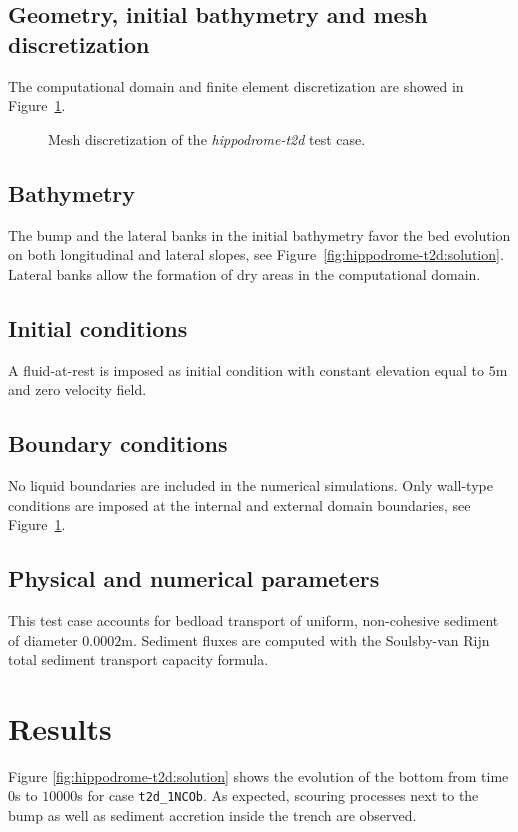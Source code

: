 \subsection{Geometry, initial bathymetry and mesh discretization}
%
The computational domain and finite element discretization are showed in Figure~\ref{fig:hippodrome-t2d:mesh}. 

\begin{figure}[H]
 \centering
 \caption{Mesh discretization of the \textit{hippodrome-t2d} test case.}
 \label{fig:hippodrome-t2d:mesh}
\end{figure}
%
\subsection{Bathymetry}
%
The bump and the lateral banks in the initial bathymetry favor the bed evolution on both longitudinal and lateral slopes, see Figure~\ref{fig:hippodrome-t2d:solution}. Lateral banks allow the formation of dry areas in the computational domain.

\subsection{Initial conditions}
%
A fluid-at-rest is imposed as initial condition with constant elevation equal to $5$m and zero velocity field.

\subsection{Boundary conditions}
%
No liquid boundaries are included in the numerical simulations. Only wall-type conditions are imposed at the internal and external domain boundaries, see Figure~\ref{fig:hippodrome-t2d:mesh}.

\subsection{Physical and numerical parameters}
%
This test case accounts for bedload transport of uniform, non-cohesive sediment of diameter $0.0002$m. Sediment fluxes are computed with the Soulsby-van Rijn total sediment transport capacity formula.

\section{Results}
Figure \ref{fig:hippodrome-t2d:solution} shows the evolution of the bottom from time $0$s to $10000$s for case \texttt{t2d\_1NCOb}. As expected, scouring processes next to the bump as well as sediment accretion inside the trench are observed.


